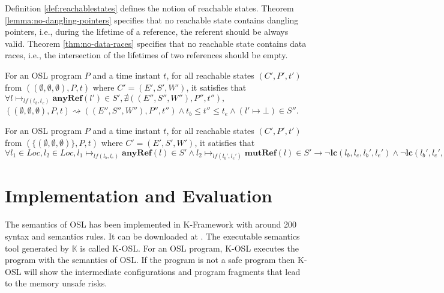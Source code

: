 \documentclass[runningheads]{llncs}
\newcommand{\terminal}[1]{\textbf{#1}}
\begin{document}
Definition \ref{def:reachablestates} defines the notion of reachable states. Theorem \ref{lemma:no-dangling-pointers}  specifies that no reachable state contains dangling pointers, i.e.,
during the lifetime of a reference, the referent should be always valid.
Theorem \ref{thm:no-data-races} specifies that no reachable state contains data races, i.e.,
the intersection of the lifetimes of two references should be empty.



\begin{theorem}
	\label{lemma:no-dangling-pointers}
For an OSL program $P$ and a time instant $t$, for all reachable states $(C',P',t')$ from $((\emptyset,\emptyset,\emptyset),P,t)$ where $C'=(E',S',W')$, it satisfies that 
$\forall l\mapsto_{lf(t_b,t_e)} \terminal{anyRef}(l')\in S', \nexists ((E'',S'',W''),P'',t''),$ $ ((\emptyset,\emptyset,\emptyset),P,t)\rightsquigarrow((E'',S'',W''),P'',t'')\land t_b\leq t''\leq t_e\land(l'\mapsto\bot)\in S''$.

\end{theorem}



\begin{theorem}
	\label{thm:no-data-races}
For an OSL program $P$ and a time instant $t$, for all reachable states $(C',P',t')$ from $(\{(\emptyset,\emptyset,\emptyset)\},P,t)$ where $C'=(E',S',W')$, it satisfies that $\forall l_1\in Loc, l_2\in Loc,  l_1\mapsto_{lf(l_b,l_e)} \terminal{anyRef}(l)\in S'\land l_2\mapsto_{lf(l_b',l_e')}\terminal{mutRef}(l)\in S'\rightarrow\neg \terminal{lc}(l_b,l_e,l_b',l_e')\land \neg \terminal{lc}(l_b',l_e',l_b,l_e).$
\end{theorem} 





\section{Implementation and Evaluation}
\label{sec:imp-eval}


The semantics of OSL has been implemented in K-Framework with around 200 syntax and semantics rules. It can be downloaded at \cite{OSL}.
The executable semantics tool generated by $\mathbb{K}$ is called K-OSL.
For an OSL program, K-OSL executes the program with the semantics of OSL.
If the program is not a safe program then K-OSL will show the intermediate configurations and program fragments that 
lead to the memory unsafe risks.
\end{document}
